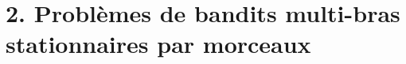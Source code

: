 \documentclass[11pt,french,ignorenonframetext,]{beamer}
\begin{document}






\section{\hfill{}2. Problèmes de bandits multi-bras stationnaires par morceaux\hfill{}}
\end{document}
